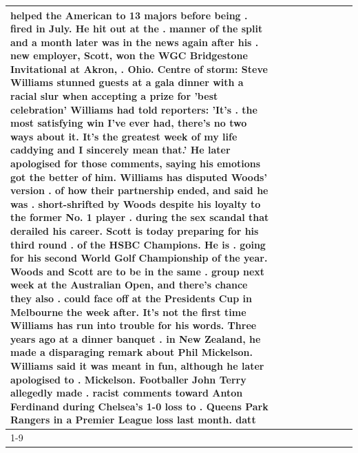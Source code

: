 \begin{table}[H]
\begin{tabular}{lllrlllll}
helped the American to 13 majors before being . fired in July. He hit out at the . manner of the split and a month later was in the news again after his . new employer, Scott, won the WGC Bridgestone Invitational at Akron, . Ohio. Centre of storm: Steve Williams stunned guests at a gala dinner with a racial slur when accepting a prize for 'best celebration' Williams had told reporters: 'It's . the most satisfying win I've ever had, there's no two ways about it. It's the greatest week of my life caddying and I sincerely mean that.' He later apologised for those comments, saying his emotions got the better of him. Williams has disputed Woods' version . of how their partnership ended, and said he was . short-shrifted by Woods despite his loyalty to the former No. 1 player . during the sex scandal that derailed his career. Scott is today preparing for his third round . of the HSBC Champions. He is . going for his second World Golf Championship of the year. Woods and Scott are to be in the same . group next week at the Australian Open, and there's chance they also . could face off at the Presidents Cup in Melbourne the week after. It's not the first time Williams has run into trouble for his words. Three years ago at a dinner banquet . in New Zealand, he made a disparaging remark about Phil Mickelson. Williams said it was meant in fun, although he later apologised to . Mickelson. Footballer John Terry allegedly made . racist comments toward Anton Ferdinand during Chelsea's 1-0 loss to . Queens Park Rangers in a Premier League loss last month. datt \\
\cline{1-9}

\end{tabular}
\end{table}
